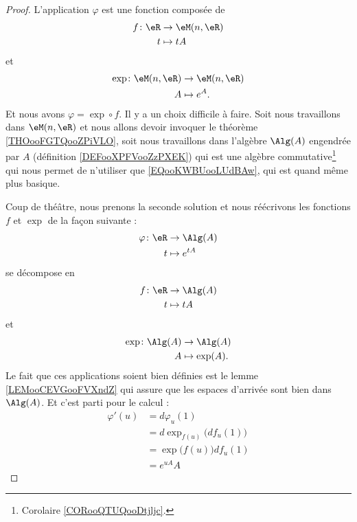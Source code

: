 \begin{proof}
	L'application \( \varphi\) est une fonction composée de
	\begin{equation}
		\begin{aligned}
			f\colon \eR & \to \eM(n,\eR) \\
			t           & \mapsto tA
		\end{aligned}
	\end{equation}
	et
	\begin{equation}
		\begin{aligned}
			\exp\colon \eM(n,\eR) & \to \eM(n,\eR) \\
			A                     & \mapsto e^A.
		\end{aligned}
	\end{equation}
	Et nous avons \( \varphi=\exp\circ f\). Il y a un choix difficile à faire. Soit nous travaillons dans \( \eM(n,\eR)\) et nous allons devoir invoquer le théorème \ref{THOooFGTQooZPiVLO}, soit nous travaillons dans l'algèbre \( \Alg(A)\)  engendrée par \( A\) (définition \ref{DEFooXPFVooZzPXEK})
	qui est une algèbre commutative\footnote{Corolaire \ref{CORooQTUQooDtjljc}.} qui nous permet de n'utiliser que \ref{EQooKWBUooLUdBAw}, qui est quand même plus basique.

	Coup de théâtre, nous prenons la seconde solution et nous réécrivons les fonctions \( f\) et \( \exp\) de la façon suivante :
	\begin{equation}
		\begin{aligned}
			\varphi\colon \eR & \to \Alg(A)     \\
			t                 & \mapsto  e^{tA}
		\end{aligned}
	\end{equation}
	se décompose en
	\begin{equation}
		\begin{aligned}
			f\colon \eR & \to \Alg(A) \\
			t           & \mapsto tA
		\end{aligned}
	\end{equation}
	et
	\begin{equation}
		\begin{aligned}
			\exp\colon \Alg(A) & \to \Alg(A)      \\
			A                  & \mapsto \exp(A).
		\end{aligned}
	\end{equation}
	Le fait que ces applications soient bien définies est le lemme \ref{LEMooCEVGooFVXndZ} qui assure que les espaces d'arrivée sont bien dans \( \Alg(A)\). Et c'est parti pour le calcul :
	\begin{subequations}
		\begin{align}
			\varphi'(u) & =d\varphi_u(1)      \label{SUBEQooFDPQooBzTDXF}                    \\
			            & =d\exp_{f(u)}\big( df_u(1) \big)       \label{SUBEQooVOFWooDoTQGy} \\
			            & =\exp\big( f(u) \big)df_u(1)       \label{SUBEQooCILLooHsFDOE}     \\
			            & = e^{uA}A      \label{SUBEQooBMAQooNtbzBI}
		\end{align}
	\end{subequations}


\end{proof}
